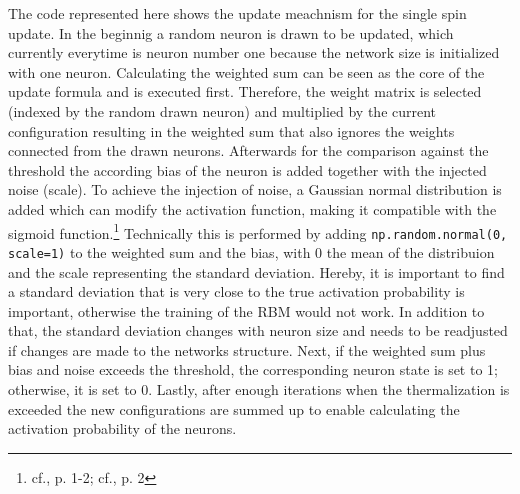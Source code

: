 The code represented here shows the update meachnism for the single spin update. 
In the beginnig a random neuron is drawn to be updated, which currently everytime is neuron number one because the network size is initialized with one neuron. 
Calculating the weighted sum can be seen as the core of the update formula and is executed first.
Therefore, the weight matrix is selected (indexed by the random drawn neuron) and multiplied by the current configuration resulting in 
the weighted sum that also ignores the weights connected from the drawn neurons.
Afterwards for the comparison against the threshold the according bias of the neuron is added together with the injected noise (scale).
To achieve the injection of noise, a Gaussian normal distribution is added which can modify the activation function, making it compatible with the sigmoid function.\footnote{cf.\cite{bohmNoiseinjectedAnalogIsing2022}, p. 1-2; cf.\cite{mahmoodiVersatileStochasticDot2019}, p. 2}
Technically this is performed by adding \texttt{np.random.normal(0, scale=1)} to the weighted sum and the bias, with 0  the mean of the distribuion and the scale representing the standard deviation. 
Hereby, it is important to find a standard deviation that is very close to the true activation probability is important, otherwise the training of the RBM would not work.
In addition to that, the standard deviation changes with neuron size and needs to be readjusted if changes are made to the networks structure.
Next, if the weighted sum plus bias and noise exceeds the threshold, the corresponding neuron state is set to 1; otherwise, it is set to 0.
Lastly, after enough iterations when the thermalization is exceeded the new configurations
are summed up to enable calculating the activation probability of the neurons. 

